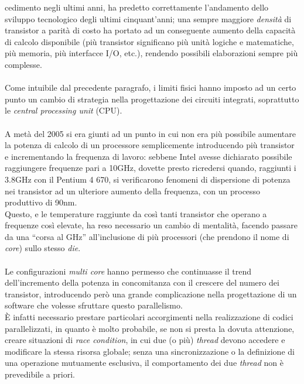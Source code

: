 cedimento negli ultimi anni\citep{MooresLaw}, ha 
predetto correttamente l'andamento dello sviluppo tecnologico degli ultimi
cinquant'anni; una sempre maggiore \emph{densità} di transistor a parità
di costo ha portato ad un conseguente aumento della capacità di calcolo 
disponibile (più transistor significano più unità logiche e matematiche,
più memoria, più interfacce I/O, etc.), rendendo possibili elaborazioni
sempre più complesse. 
\\ \\
Come intuibile dal precedente paragrafo, i limiti fisici hanno imposto ad un 
certo punto un cambio di strategia nella progettazione dei circuiti integrati,
soprattutto le \emph{central processing unit} (CPU).
\\ \\
A metà del 2005 si era giunti ad un punto in cui non era più possibile 
aumentare la potenza di calcolo di un processore semplicemente introducendo
più transistor e incrementando la frequenza di lavoro: sebbene Intel avesse 
dichiarato possibile raggiungere frequenze pari a 10GHz, dovette presto 
ricredersi quando, raggiunti i 3.8GHz con il Pentium 4 670, si verificarono 
fenomeni di dispersione di potenza nei transistor ad un ulteriore aumento della 
frequenza, con un processo produttivo di 90nm. \\
Questo, e le temperature raggiunte da così tanti transistor che operano a 
frequenze così elevate, ha reso necessario un cambio di mentalità, facendo 
passare da una ``corsa al GHz'' all'inclusione di più processori (che 
prendono il nome di \emph{core}) sullo stesso \emph{die}. 
\\ \\
Le configurazioni \emph{multi core} hanno permesso che continuasse il 
trend %
 dell'incremento della potenza in concomitanza con il crescere 
del numero dei transistor, introducendo però una grande complicazione nella 
progettazione di un software che volesse sfruttare questo parallelismo. \\
È infatti necessario prestare particolari accorgimenti nella realizzazione 
di codici parallelizzati, in quanto è molto probabile, se non si presta la 
dovuta attenzione, creare situazioni di \emph{race condition}, in cui due (o 
più) \emph{thread} devono accedere e modificare la stessa risorsa globale; 
senza una sincronizzazione o la definizione di una operazione mutuamente 
esclusiva, il comportamento dei due \emph{thread} non è prevedibile a priori. \\
